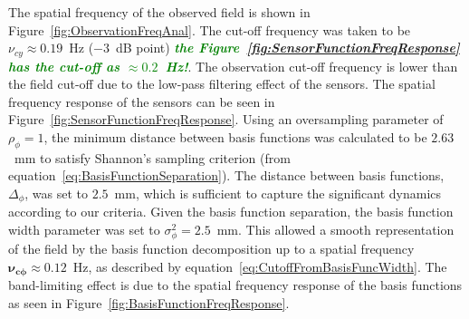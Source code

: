 \documentclass[10pt,a4paper]{article}
\newcommand{\dean}[1]{\textsf{\emph{\textbf{\textcolor{green}{#1}}}}}
\begin{document}
The spatial frequency of the observed field is shown in Figure~\ref{fig:ObservationFreqAnal}. The cut-off frequency was taken to be $\nu_{cy} \approx 0.19$~Hz ($-3$~dB point) \dean{the Figure~\ref{fig:SensorFunctionFreqResponse} has the cut-off as $\approx 0.2$~Hz!}. The observation cut-off frequency is lower than the field cut-off due to the low-pass filtering effect of the sensors. The spatial frequency response of the sensors can be seen in Figure~\ref{fig:SensorFunctionFreqResponse}. Using an oversampling parameter of $\rho_{\phi}=1$, the minimum distance between basis functions was calculated to be $2.63$~mm to satisfy Shannon's sampling criterion (from equation~\ref{eq:BasisFunctionSeparation}). The distance between basis functions, $\Delta_{\phi}$, was set to $2.5$~mm, which is sufficient to capture the significant dynamics according to our criteria.
Given the basis function separation, the basis function width parameter was set to $\sigma_{\phi}^2=2.5$~mm. This allowed a smooth representation of the field by the basis function decomposition up to a spatial frequency $\mathbf{\nu_{c\phi}} \approx 0.12$~Hz, as described by equation~\ref{eq:CutoffFromBasisFuncWidth}. The band-limiting effect is due to the spatial frequency response of the basis functions as seen in Figure~\ref{fig:BasisFunctionFreqResponse}.
\end{document}
